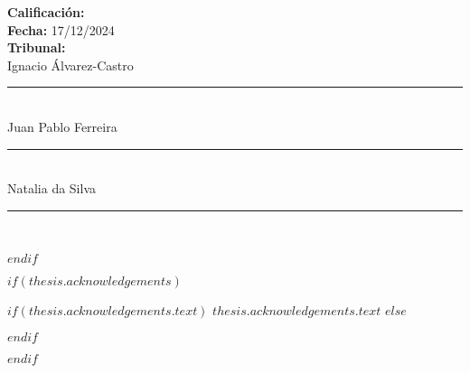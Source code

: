     \begin{flushleft}
    \textbf{Calificación:} \\
    \vspace{0.8cm}
    \textbf{Fecha:} 17/12/2024\\
    \vspace{1cm}
    \textbf{Tribunal:}\\
    \vspace{0.8cm}
    Ignacio Álvarez-Castro {\rule{0.5\textwidth}{.4pt}}\\
    \vspace{0.8cm}
    Juan Pablo Ferreira{\rule{0.5\textwidth}{.4pt}}\\
    \vspace{0.8cm}
    Natalia da Silva {\rule{0.5\textwidth}{.4pt}}\\

    \end{flushleft}

$endif$

$if(thesis.acknowledgements)$

\begin{acknowledgements}
\addchaptertocentry{\acknowledgementname} %
$if(thesis.acknowledgements.text)$
$thesis.acknowledgements.text$
$else$

$endif$
\end{acknowledgements}

$endif$


\begingroup
\hypersetup{linkcolor=$if(toclinkcolor)$$toclinkcolor$$else$black$endif$}


\renewcommand{\chaptername}{Capítulo}
\renewcommand{\tablename}{Tabla}
\renewcommand{\contentsname}{Índice}
\renewcommand{\listfigurename}{Lista de Figuras}
\renewcommand{\listtablename}{Lista de Tablas}





\tableofcontents %

\listoffigures %

